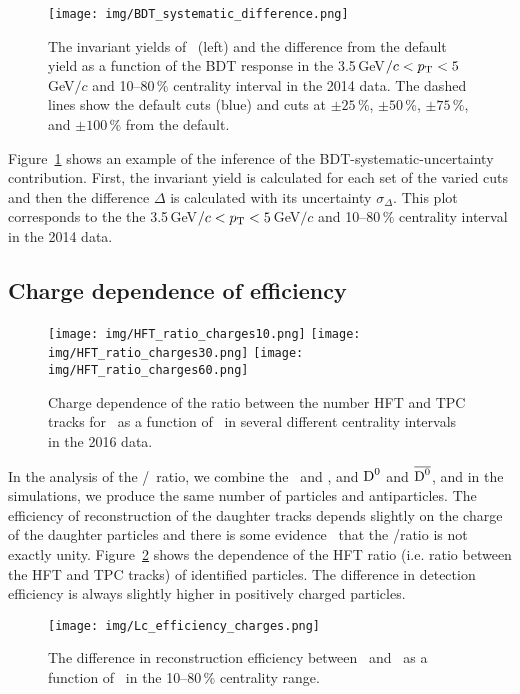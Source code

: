 \begin{figure}[!htb]
\centering
\texttt{[image: img/BDT\_systematic\_difference.png]}
\caption{\label{BDT_syst_difference} The invariant yields of \Lambdac\ (left) and the difference from the default yield as a function of the BDT response in the 3.5$\,$GeV$/c < {p_{\mathrm{T}}} < 5\,$GeV$/c$ and 10--80$\,\%$ centrality interval in the 2014 data. The dashed lines show the default cuts (blue) and cuts at $\pm 25\,\%$, $\pm 50\,\%$, $\pm 75\,\%$, and $\pm 100\,\%$ from the default.}
\end{figure}

Figure~\ref{BDT_syst_difference} shows an example of the inference of the BDT-systematic-uncertainty contribution. First, the invariant yield is calculated for each set of the varied cuts and then the difference $\Delta$ is calculated with its uncertainty $\sigma_\Delta$. This plot corresponds to the the 3.5$\,$GeV$/c < {p_{\mathrm{T}}} < 5\,$GeV$/c$ and 10--80$\,\%$ centrality interval in the 2014 data.

\subsection{Charge dependence of efficiency}

\begin{figure}[!htb]
\centering
\texttt{[image: img/HFT\_ratio\_charges10.png]}
\texttt{[image: img/HFT\_ratio\_charges30.png]}
\texttt{[image: img/HFT\_ratio\_charges60.png]}
\caption{\label{HFT_ratio_charge} Charge dependence of the ratio between the number HFT and TPC tracks for \pKandpi\ as a function of \pt\ in several different centrality intervals in the 2016 data.}
\end{figure}

In the analysis of the \Lambdac/\dzero\ ratio, we combine the \Lcplus\ and \LcminusBar, and ${\text{D}^0}$ and $\overline{{\text{D}^0}}$, and in the simulations, we produce the same number of particles and antiparticles. The efficiency of reconstruction of the daughter tracks depends slightly on the charge of the daughter particles and there is some evidence~\cite{D0paper} that the \Lcminus/\Lcplus ratio is not exactly unity. Figure~\ref{HFT_ratio_charge} shows the dependence of the HFT ratio (i.e. ratio between the HFT and TPC tracks) of identified particles. The difference in detection efficiency is always slightly higher in positively charged particles.

\begin{figure}[!htb]
\centering
\texttt{[image: img/Lc\_efficiency\_charges.png]}

\caption{\label{Lc_eff_charge} The difference in reconstruction efficiency between \Lcplus\ and \Lcminus\ as a function of \pt\ in the 10--80$\,\%$ centrality range.}
\end{figure}


